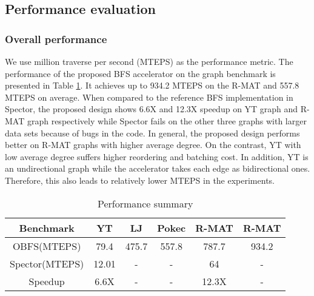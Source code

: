 \subsection{Performance evaluation}
\subsubsection{Overall performance}
We use million traverse per second (MTEPS) as 
the performance metric. The performance of the proposed BFS 
accelerator on the graph benchmark is 
presented in Table \ref{tab:performance-summary}. 
It achieves up to 934.2 MTEPS on the R-MAT\uppercase\expandafter{}
and 557.8 MTEPS on average. When compared to the reference BFS 
implementation in Spector, the proposed design shows 6.6X and 12.3X 
speedup on YT graph and R-MAT\uppercase\expandafter{} 
graph respectively while Spector fails on the other three graphs with larger data sets 
because of bugs in the code. In general, the proposed design performs better on 
R-MAT graphs with higher average degree. On the contrast, YT with 
low average degree suffers higher reordering and batching cost. In addition, 
YT is an undirectional graph while the accelerator takes each edge as bidirectional ones. 
Therefore, this also leads to relatively lower MTEPS in the experiments. 
\begin{table}
    \centering
  \caption{Performance summary}
  \label{tab:performance-summary}
  \begin{tabular}{cccccc}
    \toprule
      Benchmark & YT & LJ & Pokec & R-MAT\uppercase\expandafter{\romannumeral1} & R-MAT\uppercase\expandafter{\romannumeral2} \\
    \midrule
	OBFS(MTEPS) & 79.4 & 475.7 & 557.8 & 787.7 & 934.2 \\
	Spector(MTEPS) & 12.01 & - & - & 64 & -\\
      Speedup & 6.6X & - & - & 12.3X & - \\
  \bottomrule
\end{tabular}
\vspace{-1em}
\end{table}


